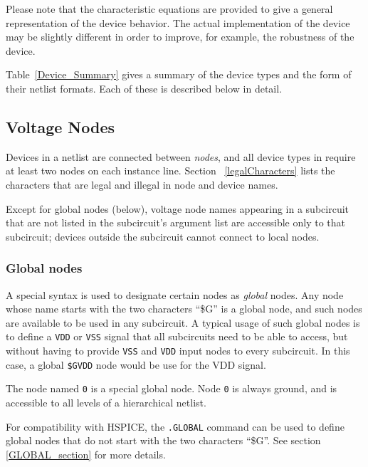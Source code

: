 Please note that the characteristic equations are
provided to give a general representation of the device behavior.  The actual
\Xyce{} implementation of the device may be slightly different in order to
improve, for example, the robustness of the device.

Table~\ref{Device_Summary} gives a summary of the device types and the form of
their netlist formats.  Each of these is described below in detail.





\clearpage
\subsection{Voltage Nodes}
\label{Voltage_Nodes}
  

Devices in a netlist are connected between {\em nodes}, and all device
types in \Xyce{} require at least two nodes on each instance line. Section
~\ref{legalCharacters} lists the characters that are legal and illegal in
\Xyce{} node and device names.

Except for global nodes (below), voltage node names appearing in a
subcircuit that are not listed in the subcircuit's argument list are
accessible only to that subcircuit; devices outside the subcircuit
cannot connect to local nodes.

\subsubsection{Global nodes}
A special syntax is used to designate certain nodes as {\em global}
nodes.  Any node whose name starts with the two characters ``\$G'' is
a global node, and such nodes are available to be used in any
subcircuit.  A typical usage of such global nodes is to define a \texttt{VDD}
or \texttt{VSS} signal that all subcircuits need to be able to access, but
without having to provide \texttt{VSS} and \texttt{VDD} input
nodes to every subcircuit.  In this case, a global \texttt{\$GVDD} node
would be use for the VDD signal.

The node named \texttt{0} is a special global node.  Node \texttt{0}
is always ground, and is accessible to all levels of a hierarchical
netlist.

For compatibility with HSPICE, the \texttt{.GLOBAL} command can
be used to define global nodes that do not start with the two
characters ``\$G''.  See section \ref{GLOBAL_section} for more details.

